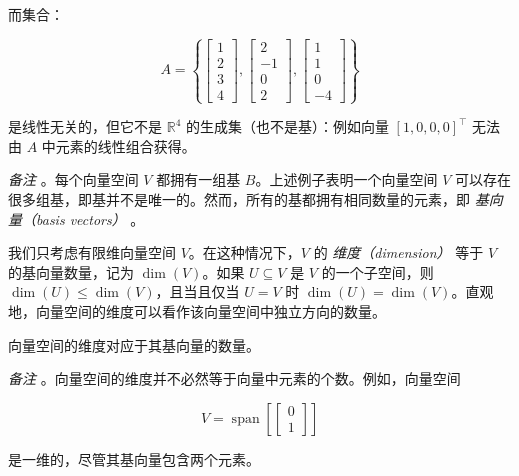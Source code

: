 \begin{notebox}
而集合：

\begin{equation}
A = \left\{ \begin{bmatrix} 1 \\ 2 \\ 3 \\ 4 \end{bmatrix}, \begin{bmatrix} 2 \\ -1 \\ 0 \\ 2 \end{bmatrix}, \begin{bmatrix} 1 \\ 1 \\ 0 \\ -4 \end{bmatrix} \right\}
\tag{2.80}\label{eq:2-80}
\end{equation}

是线性无关的，但它不是 $ \mathbb{R}^4 $ 的生成集（也不是基）：例如向量 $ [1, 0, 0, 0]^\top $ 无法由 $ A $ 中元素的线性组合获得。
\end{notebox}

\emph{备注} 。每个向量空间 $ V $ 都拥有一组基 $ B $。上述例子表明一个向量空间 $ V $ 可以存在很多组基，即基并不是唯一的。然而，所有的基都拥有相同数量的元素，即 \emph{基向量（basis vectors）} 。

我们只考虑有限维向量空间 $ V $。在这种情况下，$ V $ 的 \emph{维度（dimension）} 等于 $ V $ 的基向量数量，记为 $ \operatorname{dim}(V) $。如果 $ U \subseteq V $ 是 $ V $ 的一个子空间，则 $ \operatorname{dim}(U) \leqslant \operatorname{dim}(V) $，且当且仅当 $ U = V $ 时 $ \operatorname{dim}(U) = \operatorname{dim}(V) $。直观地，向量空间的维度可以看作该向量空间中独立方向的数量。

\begin{notebox}
向量空间的维度对应于其基向量的数量。
\end{notebox}

\emph{备注} 。向量空间的维度并不必然等于向量中元素的个数。例如，向量空间

\begin{equation*}
V = \operatorname{span}\left[\begin{bmatrix} 0 \\ 1 \end{bmatrix}\right]
\end{equation*}

是一维的，尽管其基向量包含两个元素。

